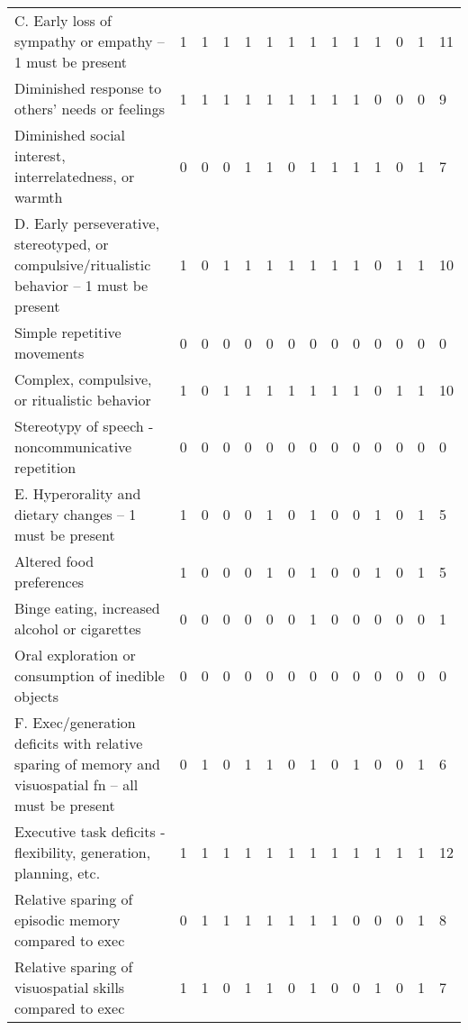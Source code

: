 \documentclass[]{article}
\begin{document}
\begin{table}
{\begin{tabular}[t]{llllllllllllll}
C. Early loss of sympathy or empathy -- 1 must be present & 1 & 1 & 1 & 1 & 1 & 1 & 1 & 1 & 1 & 1 & 0 & 1 & 11\\
\hspace{1em}Diminished response to others' needs or feelings & 1 & 1 & 1 & 1 & 1 & 1 & 1 & 1 & 1 & 0 & 0 & 0 & 9\\
\hspace{1em}Diminished social interest, interrelatedness, or warmth & 0 & 0 & 0 & 1 & 1 & 0 & 1 & 1 & 1 & 1 & 0 & 1 & 7\\
D.  Early perseverative, stereotyped, or compulsive/ritualistic behavior -- 1 must be present & 1 & 0 & 1 & 1 & 1 & 1 & 1 & 1 & 1 & 0 & 1 & 1 & 10\\
\addlinespace
\hspace{1em}Simple repetitive movements & 0 & 0 & 0 & 0 & 0 & 0 & 0 & 0 & 0 & 0 & 0 & 0 & 0\\
\hspace{1em}Complex, compulsive, or ritualistic behavior & 1 & 0 & 1 & 1 & 1 & 1 & 1 & 1 & 1 & 0 & 1 & 1 & 10\\
\hspace{1em}Stereotypy of speech - noncommunicative repetition & 0 & 0 & 0 & 0 & 0 & 0 & 0 & 0 & 0 & 0 & 0 & 0 & 0\\
E. Hyperorality and dietary changes -- 1 must be present & 1 & 0 & 0 & 0 & 1 & 0 & 1 & 0 & 0 & 1 & 0 & 1 & 5\\
\hspace{1em}Altered food preferences & 1 & 0 & 0 & 0 & 1 & 0 & 1 & 0 & 0 & 1 & 0 & 1 & 5\\
\addlinespace
\hspace{1em}Binge eating, increased alcohol or cigarettes & 0 & 0 & 0 & 0 & 0 & 0 & 1 & 0 & 0 & 0 & 0 & 0 & 1\\
\hspace{1em}Oral exploration or consumption of inedible objects & 0 & 0 & 0 & 0 & 0 & 0 & 0 & 0 & 0 & 0 & 0 & 0 & 0\\
F. Exec/generation deficits with relative sparing of memory and visuospatial fn -- all must be present & 0 & 1 & 0 & 1 & 1 & 0 & 1 & 0 & 1 & 0 & 0 & 1 & 6\\
\hspace{1em}Executive task deficits - flexibility, generation, planning, etc. & 1 & 1 & 1 & 1 & 1 & 1 & 1 & 1 & 1 & 1 & 1 & 1 & 12\\
\hspace{1em}Relative sparing of episodic memory compared to exec & 0 & 1 & 1 & 1 & 1 & 1 & 1 & 1 & 0 & 0 & 0 & 1 & 8\\
\hspace{1em}Relative sparing of visuospatial skills compared to exec & 1 & 1 & 0 & 1 & 1 & 0 & 1 & 0 & 0 & 1 & 0 & 1 & 7\\
\bottomrule
\end{tabular}}
\end{table}
\end{document}
